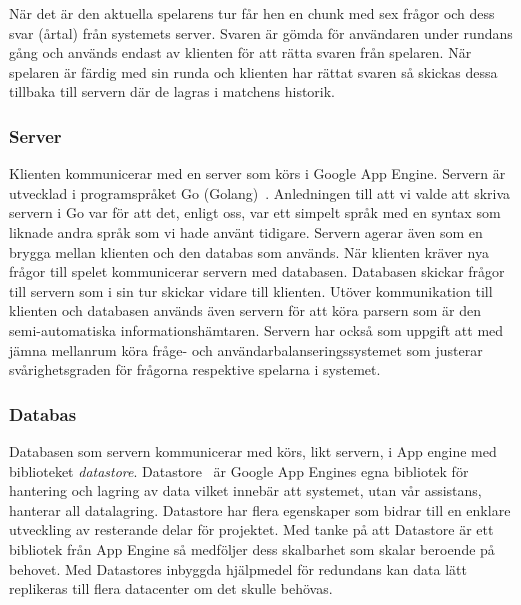 \documentclass[a4paper, 11pt]{article}
\begin{document}
När det är den aktuella spelarens tur får hen en chunk med sex frågor och dess svar (årtal) från systemets server. Svaren är gömda för användaren under rundans gång och används endast av klienten för att rätta svaren från spelaren. När spelaren är färdig med sin runda och klienten har rättat svaren så skickas dessa tillbaka till servern där de lagras i matchens historik. 

\subsubsection{Server}
Klienten kommunicerar med en server som körs i Google App Engine. Servern är utvecklad i programspråket Go (Golang)~\cite{golang}. Anledningen till att vi valde att skriva servern i Go var för att det, enligt oss, var ett simpelt språk med en syntax som liknade andra språk som vi hade använt tidigare. Servern agerar även som en brygga mellan klienten och den databas som används. När klienten kräver nya frågor till spelet kommunicerar servern med databasen. Databasen skickar frågor till servern som i sin tur skickar vidare till klienten. Utöver kommunikation till klienten och databasen används även servern för att köra parsern som är den semi-automatiska informationshämtaren. Servern har också som uppgift att med jämna mellanrum köra fråge- och användarbalanseringssystemet som justerar svårighetsgraden för frågorna respektive spelarna i systemet. 

\subsubsection{Databas}
Databasen som servern kommunicerar med körs, likt servern, i App engine med biblioteket \textit{datastore}. Datastore~\cite{datastore} är Google App Engines egna bibliotek för hantering och lagring av data vilket innebär att systemet, utan vår assistans, hanterar all datalagring. Datastore har flera egenskaper som bidrar till en enklare utveckling av resterande delar för projektet. Med tanke på att Datastore är ett bibliotek från App Engine så medföljer dess skalbarhet som skalar beroende på behovet. Med Datastores inbyggda hjälpmedel för redundans kan data lätt replikeras till flera datacenter om det skulle behövas.
\end{document}
